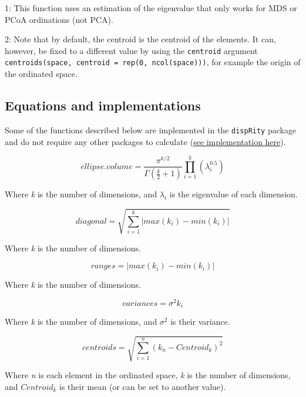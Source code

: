 \documentclass[]{book}
\theoremstyle{definition}
\theoremstyle{definition}
\theoremstyle{remark}
\begin{document}
1: This function uses an estimation of the eigenvalue that only works
for MDS or PCoA ordinations (not PCA).

2: Note that by default, the centroid is the centroid of the elements.
It can, however, be fixed to a different value by using the
\texttt{centroid} argument
\texttt{centroids(space,\ centroid\ =\ rep(0,\ ncol(space)))}, for
example the origin of the ordinated space.

\subsection{Equations and
implementations}\label{equations-and-implementations}

Some of the functions described below are implemented in the
\texttt{dispRity} package and do not require any other packages to
calculate
(\href{https://github.com/TGuillerme/dispRity/blob/master/R/dispRity.metric.R}{see
implementation here}).

\begin{equation}
    ellipse.volume = \frac{\pi^{k/2}}{\Gamma(\frac{k}{2}+1)}\displaystyle\prod_{i=1}^{k} (\lambda_{i}^{0.5})
\end{equation}

Where \emph{k} is the number of dimensions, and \(\lambda_i\) is the
eigenvalue of each dimension.

\begin{equation}
    diagonal = \sqrt{\sum_{i=1}^{k}|max(k_i) - min(k_i)|}
\end{equation}

Where \emph{k} is the number of dimensions.

\begin{equation}
    ranges = |max(k_i) - min(k_i)|
\end{equation}

Where \emph{k} is the number of dimensions.

\begin{equation}
    variances = \sigma^{2}{k_i}
\end{equation}

Where \emph{k} is the number of dimensions, and \(\sigma^{2}\) is their
variance.

\begin{equation}
    centroids = \sqrt{\sum_{i=1}^{n}{({k}_{n}-Centroid_{k})^2}}
\end{equation}

Where \emph{n} is each element in the ordinated space, \emph{k} is the
number of dimensions, and \(Centroid_{k}\) is their mean (or can be set
to another value).
\end{document}
